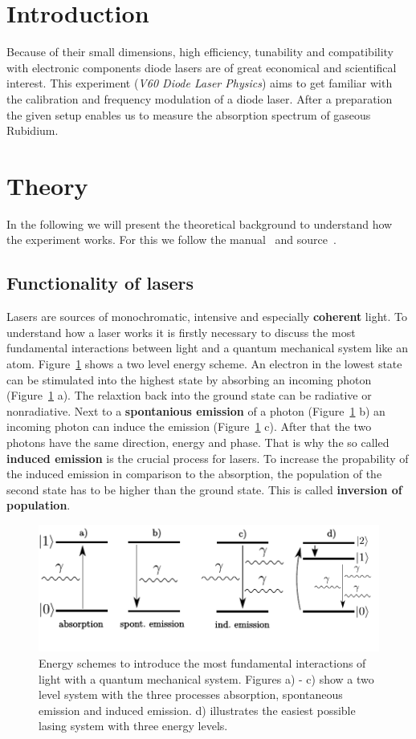 \setcounter{page}{1}
\section*{Introduction}
Because of their small dimensions, high efficiency, tunability and compatibility with electronic components
diode lasers are of great economical and scientifical interest. This experiment (\emph{V60 Diode Laser Physics}) aims to get familiar
with the calibration and frequency modulation of a diode laser. After a preparation the given setup enables us to measure
the absorption spectrum of gaseous Rubidium.

\section{Theory}
In the following we will present the theoretical background to understand how the experiment works. 
For this we follow the manual~\cite{anleitung60} and source~\cite{eichler}.

\subsection{Functionality of lasers}
Lasers are sources of monochromatic, intensive and especially \textbf{coherent} light.
To understand how a laser works it is firstly necessary to discuss the most fundamental interactions between light and
a quantum mechanical system like an atom. Figure~\ref{fig: two_level} shows a two level energy scheme. An electron in the
lowest state can be stimulated into the highest state by absorbing an incoming photon (Figure~\ref{fig: two_level} a). The relaxtion back into the
ground state can be radiative or nonradiative. Next to a \textbf{spontanious emission} of a photon (Figure~\ref{fig: two_level} b)
an incoming photon can induce the emission (Figure~\ref{fig: two_level} c). After that the two photons have the same direction, energy and phase.
That is why the so called \textbf{induced emission} is the crucial process for lasers. To increase the propability of the induced emission in
comparison to the absorption, the population of the second state has to be higher than the ground state. This is called
\textbf{inversion of population}.

\begin{figure}
  \centering
  \includegraphics[scale = 0.9]{pics/energyscheme.pdf}
  \caption{Energy schemes to introduce the most fundamental interactions of light with a quantum mechanical system. Figures a) - c) show
  a two level system with the three processes absorption, spontaneous emission and induced emission. d) illustrates the easiest possible lasing
  system with three energy levels.}
  \label{fig: two_level}
\end{figure}

